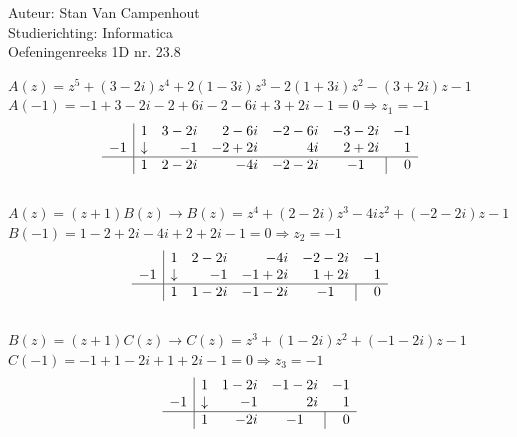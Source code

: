 \documentclass[a4paper]{article}
\begin{document}
  
\noindent \large Auteur: Stan Van Campenhout \\
\noindent \large Studierichting:  Informatica\\
\noindent \large Oefeningenreeks 1D nr. 23.8\\

\medskip

\normalsize

$ A(z) = z^5 + (3 - 2i)z^4 + 2(1 - 3i)z^3 - 2( 1 + 3i)z^2 - (3 + 2i)z - 1 $\\

$ A(-1) = -1 + 3 - 2i -2 + 6i -2 -6i +3 +2i -1  = 0 \Rightarrow z_{1} = -1 $\\

 \[ \begin{array}{c|rrrrrr}     
&1 &3-2i &2-6i &-2-6i &-3-2i &-1  \\      
-1 & \downarrow  &-1  &-2 + 2i  &4i  &2+2i &1 \\ \hline    
 &1  &2-2i &-4i  &-2-2i  &  \multicolumn{1}{c|}{-1}  & 0   
\end{array} \] \\

$ A(z) = (z + 1)B(z) \rightarrow B(z) = z^4 + (2-2i)z^3 - 4iz^2 + (-2-2i)z - 1 $\\

$ B(-1) = 1 -2 +2i -4i +2 +2i -1 = 0 \Rightarrow z_{2} = -1 $\\

 \[ \begin{array}{c|rrrrr}     
&1 &2-2i &- 4i &-2-2i &-1  \\      
-1 & \downarrow  &-1  &-1 + 2i  &1 + 2i &1 \\ \hline    
 &1  &1-2i &-1 - 2i &  \multicolumn{1}{c|}{-1}  & 0   
\end{array} \] \\

$ B(z) = (z + 1)C(z)  \rightarrow C(z) = z^3 + (1-2i)z^2 + (-1 - 2i)z - 1 $\\

$ C(-1) = -1 +1 - 2i +1 +2i -1 = 0 \Rightarrow z_{3} = -1 $\\

 \[ \begin{array}{c|rrrr}     
&1 &1-2i &-1 - 2i &-1  \\      
-1 & \downarrow  &-1  &2i &1 \\ \hline    
 &1  &-2i &  \multicolumn{1}{c|}{-1}  & 0   
\end{array} \] \\
\end{document}
